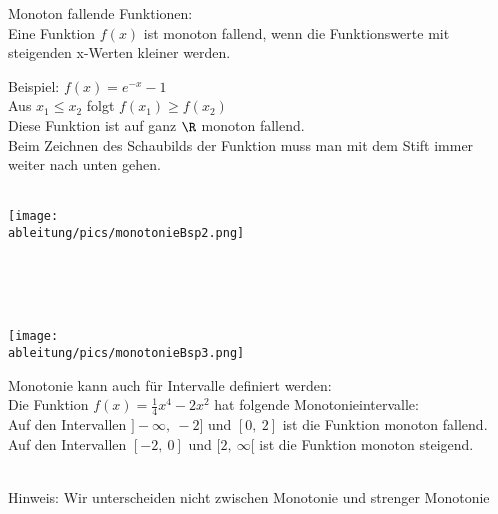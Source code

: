\begin{tcolorbox}
	Monoton fallende Funktionen:\\
	\textcolor{loestc}{Eine Funktion \(f(x)\) ist monoton fallend, wenn die Funktionswerte mit steigenden x-Werten kleiner werden.\\
	}
\end{tcolorbox}
\begin{minipage}{\textwidth}
	\begin{minipage}{0.6\textwidth}
		Beispiel: \(f(x)=e^{-x}-1\)\\
		\textcolor{loes}{Aus \(x_1\leq x_2\) folgt \(f(x_1 )\geq f(x_2)\)\\
			Diese Funktion ist auf ganz \(\R\) monoton fallend.\\
			Beim Zeichnen des Schaubilds der Funktion muss man mit dem Stift immer weiter nach unten gehen.}\\ \\
	\end{minipage}
	\begin{minipage}{0.39\textwidth}
		\centering\texttt{[image: \\ableitung/pics/monotonieBsp2.png]}\\
	\end{minipage}
\end{minipage}\\ \\ \\
\begin{minipage}{\textwidth}
	\begin{minipage}{0.39\textwidth}
		\centering\texttt{[image: \\ableitung/pics/monotonieBsp3.png]}\\
	\end{minipage}
	\begin{minipage}{0.6\textwidth}
		Monotonie kann auch für Intervalle definiert werden:\\
		Die Funktion \(f(x)=\frac{1}{4}x^4-2x^2\) hat folgende Monotonieintervalle:\\
		\textcolor{loes}{
			Auf den Intervallen \(]-\infty,\ -2]\) und \([0,\ 2]\) ist die Funktion monoton fallend.\\
			Auf den Intervallen \([-2,\ 0]\) und \([2,\ \infty[\) ist die Funktion monoton steigend.}\\
	\end{minipage}
\end{minipage}\\
\textcolor{loes}{Hinweis: Wir unterscheiden nicht zwischen Monotonie und strenger Monotonie}
